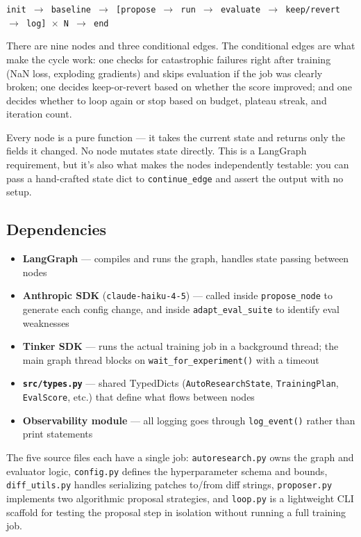 \documentclass[11pt,letterpaper]{article}
\begin{document}
\begin{center}
\texttt{init $\to$ baseline $\to$ [propose $\to$ run $\to$ evaluate $\to$ keep/revert $\to$ log] $\times$ N $\to$ end}
\end{center}

There are nine nodes and three conditional edges. The conditional edges are what make the cycle work: one checks for catastrophic failures right after training (NaN loss, exploding gradients) and skips evaluation if the job was clearly broken; one decides keep-or-revert based on whether the score improved; and one decides whether to loop again or stop based on budget, plateau streak, and iteration count.

Every node is a pure function --- it takes the current state and returns only the fields it changed. No node mutates state directly. This is a LangGraph requirement, but it's also what makes the nodes independently testable: you can pass a hand-crafted state dict to \texttt{continue\_edge} and assert the output with no setup.

\subsection{Dependencies}

\begin{itemize}
  \item \textbf{LangGraph} --- compiles and runs the graph, handles state passing between nodes
  \item \textbf{Anthropic SDK} (\texttt{claude-haiku-4-5}) --- called inside \texttt{propose\_node} to generate each config change, and inside \texttt{adapt\_eval\_suite} to identify eval weaknesses
  \item \textbf{Tinker SDK} --- runs the actual training job in a background thread; the main graph thread blocks on \texttt{wait\_for\_experiment()} with a timeout
  \item \textbf{\texttt{src/types.py}} --- shared TypedDicts (\texttt{AutoResearchState}, \texttt{TrainingPlan}, \texttt{EvalScore}, etc.) that define what flows between nodes
  \item \textbf{Observability module} --- all logging goes through \texttt{log\_event()} rather than print statements
\end{itemize}

The five source files each have a single job: \texttt{autoresearch.py} owns the graph and evaluator logic, \texttt{config.py} defines the hyperparameter schema and bounds, \texttt{diff\_utils.py} handles serializing patches to/from diff strings, \texttt{proposer.py} implements two algorithmic proposal strategies, and \texttt{loop.py} is a lightweight CLI scaffold for testing the proposal step in isolation without running a full training job.
\end{document}
